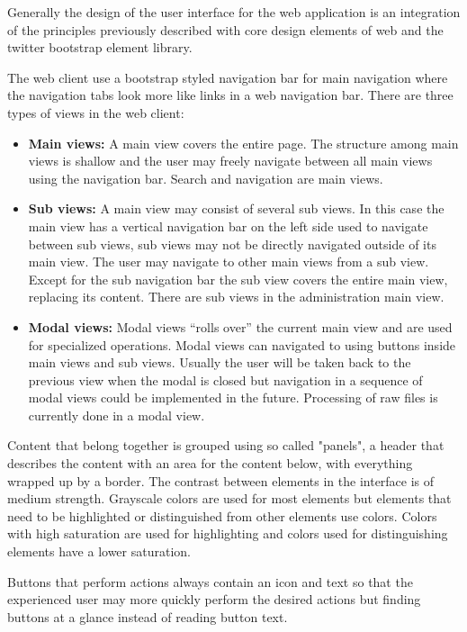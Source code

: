 Generally the design of the user interface for the web application is an integration of the principles previously described with core design elements of web and the twitter bootstrap element library.

The web client use a bootstrap styled navigation bar for main navigation where the navigation tabs look more like links in a web navigation bar. There are three types of views in the web client:

\begin{itemize}
	\item \textbf{Main views:} A main view covers the entire page. The structure among main views is shallow and the user may freely navigate between all main views using the navigation bar. Search and navigation are main views.
	\item \textbf{Sub views:} A main view may consist of several sub views. In this case the main view has a vertical navigation bar on the left side used to navigate between sub views, sub views may not be directly navigated outside of its main view. The user may navigate to other main views from a sub view. Except for the sub navigation bar the sub view covers the entire main view, replacing its content. There are sub views in the administration main view.
	\item \textbf{Modal views:} Modal views “rolls over” the current main view and are used for specialized operations. Modal views can navigated to using buttons inside main views and sub views. Usually the user will be taken back to the previous view when the modal is closed but navigation in a sequence of modal views could be implemented in the future. Processing of raw files is currently done in a modal view.
\end{itemize}

Content that belong together is grouped using so called "panels", a header that describes the content with an area for the content below, with everything wrapped up by a border.
The contrast between elements in the interface is of medium strength. Grayscale colors are used for most elements but elements that need to be highlighted or distinguished from other elements use colors. Colors with high saturation are used for highlighting and colors used for distinguishing elements have a lower saturation.

Buttons that perform actions always contain an icon and text so that the experienced user may more quickly perform the desired actions but finding buttons at a glance instead of reading button text.

